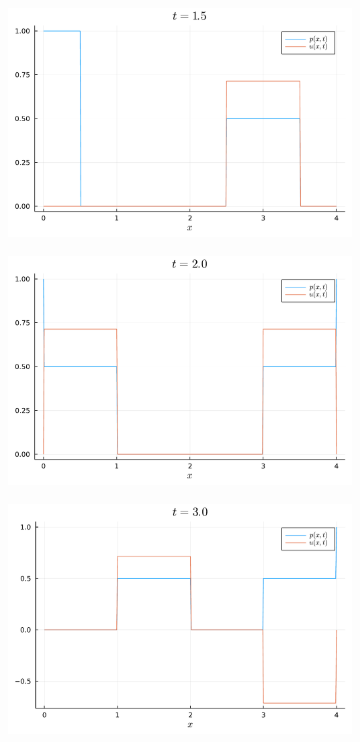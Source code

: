 \documentclass{article}
\begin{document}
\begin{figure}[H]
\begin{subfigure}{0.495\linewidth}
	\end{subfigure}
	\begin{subfigure}{0.495\linewidth}
		\centering
		\includegraphics[width=\linewidth]{prob3-5-4.pdf}
	\end{subfigure}
	\begin{subfigure}{0.495\linewidth}
	\centering
	\includegraphics[width=\linewidth]{prob3-5-5.pdf}
\end{subfigure}
	\begin{subfigure}{0.495\linewidth}
	\centering
	\includegraphics[width=\linewidth]{prob3-5-6.pdf}
\end{subfigure}
\end{figure}
\end{document}
